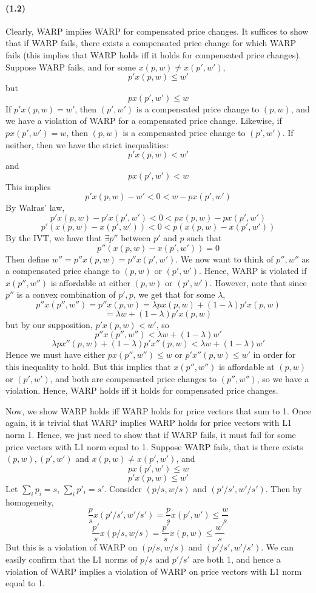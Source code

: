 \documentclass[10pt,letter]{article}
\begin{document}
\paragraph{(1.2)}
Clearly, WARP implies WARP for compensated price changes. It suffices to show that if WARP fails, there exists a compensated price change for which WARP fails (this implies that WARP holds iff it holds for compensated price changes). Suppose WARP fails, and for some $x(p,w) \neq x(p',w')$,
\[ p' x(p,w) \le w'  \]
but
\[ p x(p',w') \le w \]
If $p' x(p,w) = w'$, then $(p',w')$ is a compensated price change to $(p,w)$, and we have a violation of WARP for a compensated price change. Likewise, if $p x(p',w') = w$, then $(p,w)$  is a compensated price change to $(p',w')$. If neither, then we have the strict inequalities:
\[ p'x(p,w) < w' \]
and
\[ px(p',w') < w \]
This implies
\[ p'x(p,w) - w' < 0 < w - px(p',w') \]
By Walras' law,
\[ p'x(p,w) - p'x(p',w') < 0 < px(p,w) - px(p',w') \]
\[ p'(x(p,w) - x(p',w')) < 0 < p(x(p,w) - x(p',w'))\]
By the IVT, we have that $\exists p''$ between $p'$ and $p$ such that
\[ p''(x(p,w) - x(p',w')) = 0 \]
Then define $w'' = p''x(p,w) = p''x(p',w')$. We now want to think of $p'', w''$ as a compensated price change to $(p,w)$ or $(p', w')$. Hence, WARP is violated if $x(p'',w'')$ is affordable at either $(p,w)$ or $(p', w')$.
However, note that since $p''$ is a convex combination of $p', p$, we get that for some $\lambda$,
\[ p''x(p'',w'') = p''x(p, w) = \lambda p x(p,w) + (1-\lambda) p'x(p,w) \]
\[ = \lambda w + (1-\lambda ) p'x(p,w) \]
but by our supposition, $p'x(p,w) < w'$, so
\[ p''x(p'',w'') < \lambda w + (1-\lambda) w' \]
\[ \lambda p x''(p,w) + (1-\lambda) p'x''(p,w)< \lambda w + (1-\lambda) w' \]
Hence we must have either $px(p'',w'') \le w$ or $p'x''(p,w) \le w'$ in order for this inequality to hold. But this implies that $x(p'', w'')$ is affordable at $(p,w)$ or $(p',w')$, and both are compensated price changes to $(p'', w'')$, so we have a violation. Hence, WARP holds iff it holds for compensated price changes.

Now, we show WARP holds iff WARP holds for price vectors that sum to 1. Once again, it is trivial that WARP implies WARP holds for price vectors with L1 norm 1. Hence, we just need to show that if WARP fails, it must fail for some price vectors with L1 norm equal to 1. Suppose WARP fails, that is there exists $(p,w), (p',w')$ and $x(p,w) \neq x(p',w')$, and
\[ p x(p', w') \le w \]
\[ p' x(p, w) \le w'\]
Let $\sum_i p_i =  s$, $\sum_i p'_i =  s'$. Consider $(p/s, w/s)$ and $(p'/s', w'/s')$. Then by homogeneity,
\[ \frac{p}{s} x(p'/s', w'/s') = \frac{p}{s} x(p', w') \le \frac{w}{s} \]
\[ \frac{p'}{s} x(p/s, w/s) = \frac{p'}{s} x(p, w) \le \frac{w'}{s} \]
But this is a violation of WARP on $(p/s, w/s)$ and $(p'/s', w'/s')$. We can easily confirm that the L1 norms of $p/s$ and $p'/s'$ are both 1, and hence a violation of WARP implies a violation of WARP on price vectors with L1 norm equal to 1.
\end{document}
